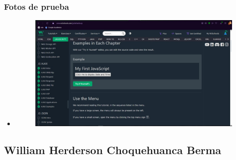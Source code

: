 \documentclass{article}
\begin{document}
	\subsubsection{Fotos de prueba}
	\begin{itemize}
		\item \begin{figure}[H]
			\centering
			\includegraphics[width=1.0\textwidth,keepaspectratio]{img/wsLuis.jpg}
		\end{figure}
	\end{itemize}
	\subsection{William Herderson Choquehuanca Berma}
\end{document}
